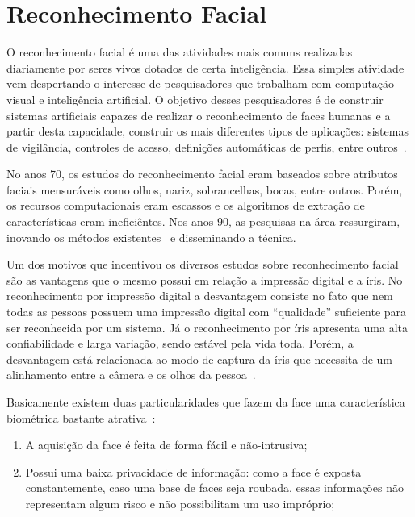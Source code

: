 \section{Reconhecimento Facial}

O reconhecimento facial é uma das atividades mais comuns realizadas diariamente por seres vivos dotados de certa inteligência. Essa simples atividade vem despertando o interesse de pesquisadores que trabalham com computação visual e inteligência artificial. O objetivo desses pesquisadores é de construir sistemas artificiais capazes de realizar o reconhecimento de faces humanas e a partir desta capacidade, construir os mais diferentes tipos de aplicações: sistemas de vigilância, controles de acesso, definições automáticas de perfis, entre outros~\cite{oliveira}.

No anos 70, os estudos do reconhecimento facial eram baseados sobre atributos faciais mensuráveis como olhos, nariz, sobrancelhas, bocas, entre outros. Porém, os recursos computacionais eram escassos e os algoritmos de extração de características eram ineficiêntes. Nos anos 90, as pesquisas na área ressurgiram, inovando os métodos existentes~\cite{hong, saocarlos} e disseminando a técnica.

Um dos motivos que incentivou os diversos estudos sobre reconhecimento facial são as vantagens que o mesmo possui em relação a impressão digital e a íris.  No reconhecimento por impressão digital a desvantagem consiste no fato que nem todas as pessoas possuem uma impressão digital com ``qualidade'' suficiente para ser reconhecida por um sistema. Já o reconhecimento por íris apresenta uma alta confiabilidade e larga variação, sendo estável pela vida toda. Porém, a desvantagem está relacionada ao modo de captura da íris que necessita de um alinhamento entre a câmera e os olhos da pessoa~\cite{saocarlos}. 

Basicamente existem duas particularidades que fazem da face uma característica biométrica bastante atrativa~\cite{drovetto}:

	\begin{enumerate}
		\item A aquisição da face é feita de forma fácil e não-intrusiva;
		\item Possui uma baixa privacidade de informação: como a face é exposta constantemente, caso uma base de faces seja roubada, essas informações não representam algum risco e não possibilitam um uso impróprio;
	\end{enumerate}

